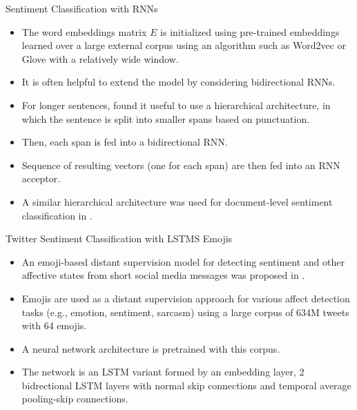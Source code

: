 \documentclass[handout]{beamer}
\begin{document}
\begin{frame}{Sentiment Classification with RNNs}
\begin{scriptsize}
\begin{itemize}
\item The word embeddings matrix $E$ is initialized using pre-trained embeddings learned over a large external corpus using an algorithm such as Word2vec or Glove with a relatively wide window.
\item It is often helpful to extend the model by considering bidirectional RNNs.
\item For longer sentences, \cite{li2015tree} found it useful to use a hierarchical architecture, in which the sentence is split into smaller spans based on punctuation.
\item Then, each span is fed into a bidirectional RNN. 
\item Sequence of resulting vectors (one for each span) are then fed into an RNN acceptor.
\item A similar hierarchical architecture was used for document-level sentiment classification in \cite{tang2015document}.
\end{itemize}
\end{scriptsize}
\end{frame}



\begin{frame}{Twitter Sentiment Classification with LSTMS Emojis}
\begin{scriptsize}
\begin{itemize}
\item An emoji-based distant supervision model for detecting sentiment and other affective states from short social media messages was proposed in \cite{FelboMSRL17}.
\item Emojis are used as a distant supervision approach for various affect detection tasks (e.g., emotion, sentiment, sarcasm) using a large corpus of 634M tweets with 64 emojis.
\item A neural network architecture is pretrained with this corpus. 
\item The network is an LSTM variant formed by an embedding layer, 2 bidrectional LSTM layers with normal skip connections and temporal average pooling-skip connections.
\end{itemize}
\end{scriptsize}
\end{frame}
\end{document}
